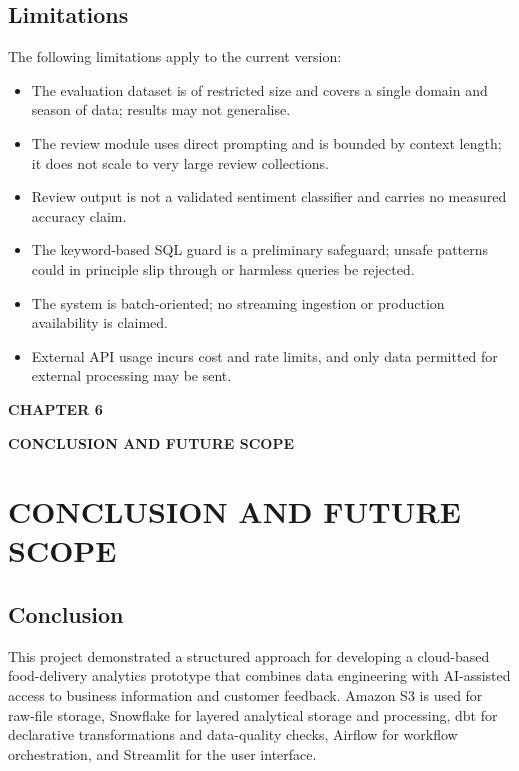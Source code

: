 \documentclass[12pt,a4paper]{report}
\newcommand{\chaptersplit}[2]{%
  \clearpage
  \thispagestyle{empty}%
  \vspace*{\fill}
  \begin{center}
    {\fontsize{16}{20}\selectfont\bfseries CHAPTER #1\par}
    \vspace{1.2cm}
    {\fontsize{16}{20}\selectfont\bfseries #2\par}
  \end{center}
  \vspace*{\fill}
  \clearpage
}
\begin{document}
\section{Limitations}
The following limitations apply to the current version:
\begin{itemize}[leftmargin=2em]
\item The evaluation dataset is of restricted size and covers a single domain and season of data; results may not generalise.
\item The review module uses direct prompting and is bounded by context length; it does not scale to very large review collections.
\item Review output is not a validated sentiment classifier and carries no measured accuracy claim.
\item The keyword-based SQL guard is a preliminary safeguard; unsafe patterns could in principle slip through or harmless queries be rejected.
\item The system is batch-oriented; no streaming ingestion or production availability is claimed.
\item External API usage incurs cost and rate limits, and only data permitted for external processing may be sent.
\end{itemize}

\chaptersplit{6}{CONCLUSION AND FUTURE SCOPE}

\chapter{CONCLUSION AND FUTURE SCOPE}

\section{Conclusion}
This project demonstrated a structured approach for developing a cloud-based food-delivery analytics prototype that combines data engineering with AI-assisted access to business information and customer feedback. Amazon S3 is used for raw-file storage, Snowflake for layered analytical storage and processing, dbt for declarative transformations and data-quality checks, Airflow for workflow orchestration, and Streamlit for the user interface.
\end{document}
